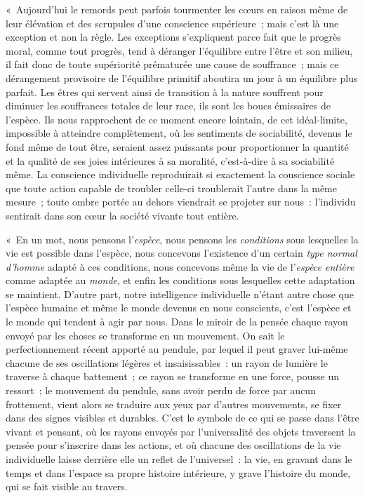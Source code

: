 \documentclass[french,twoside]{book} %
\begin{document}
{ « Aujourd’hui le remords peut parfois tourmenter les cœurs en raison même de leur élévation et des scrupules d’une conscience supérieure ; mais c’est là une exception et non la règle. Les exceptions s’expliquent parce fait que le progrès moral, comme tout progrès, tend à déranger l’équilibre entre l’être et son milieu, il fait donc de toute supériorité prématurée une cause de souffrance ; mais ce dérangement provisoire de l’équilibre primitif aboutira un jour à un équilibre plus parfait. Les êtres qui servent ainsi de transition à la nature souffrent pour diminuer les souffrances totales de leur race, ils sont les boucs émissaires de l’espèce. Ils nous rapprochent de ce moment encore lointain, de cet idéal-limite, impossible à atteindre complètement, où les sentiments de sociabilité, devenus le fond même de tout être, seraient assez puissants pour proportionner la quantité et la qualité de ses joies intérieures à sa moralité, c’est-à-dire à sa sociabilité même. La conscience individuelle reproduirait si exactement la couscience sociale que toute action capable de troubler celle-ci troublerait l’autre dans la même mesure ; toute ombre portée au dehors viendrait se projeter sur nous : l’individu sentirait dans son cœur la société vivante tout entière.\par
 « En un mot, nous pensons l’\emph{espèce}, nous pensons les \emph{conditions} sous lesquelles la vie est possible dans l’espèce, nous concevons l’existence d’un certain \emph{type normal d’homme} adapté à ces conditions, nous concevons même la vie de l’\emph{espèce entière} comme adaptée au \emph{monde}, et enfin les conditions sous lesquelles cette adaptation se maintient. D’autre part, notre intelligence individuelle n’étant autre chose que l’espèce humaine et même le monde devenus en nous conscients, c’est l’espèce et le monde qui tendent à agir par nous. Dans le miroir de la pensée chaque rayon envoyé par les choses se transforme en un mouvement. On sait le perfectionnement récent apporté au pendule, par lequel il peut graver lui-même chacune de ses oscillations légères et insaisissables : un rayon de lumière le traverse à chaque battement ; ce rayon se transforme en une force, pousse un ressort ; le mouvement du pendule, sans avoir perdu de force par aucun frottement, vient alors se traduire aux yeux par d’autres mouvements, se fixer dans des signes visibles et durables. C’est le symbole de ce qui se passe dans l’être vivant et pensant, où les rayons envoyés par l’universalité des objets traversent la pensée pour s’inscrire dans les actions, et où chacune des oscillations de la vie individuelle laisse derrière elle un reflet de l’universel : la vie, en gravant dans le temps et dans l’espace sa propre histoire intérieure, y grave l’histoire du monde, qui se fait visible au travers.\par
}
\end{document}
